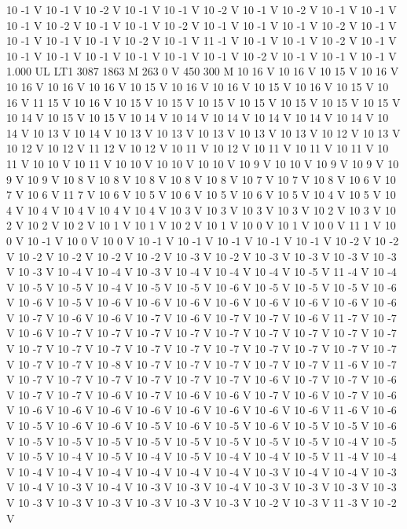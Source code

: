 {{10 -1 V
10 -1 V
10 -2 V
10 -1 V
10 -1 V
10 -2 V
10 -1 V
10 -2 V
10 -1 V
10 -1 V
10 -1 V
10 -2 V
10 -1 V
10 -1 V
10 -2 V
10 -1 V
10 -1 V
10 -1 V
10 -2 V
10 -1 V
10 -1 V
10 -1 V
10 -1 V
10 -2 V
10 -1 V
11 -1 V
10 -1 V
10 -1 V
10 -2 V
10 -1 V
10 -1 V
10 -1 V
10 -1 V
10 -1 V
10 -1 V
10 -1 V
10 -2 V
10 -1 V
10 -1 V
10 -1 V
1.000 UL
LT1
3087 1863 M
263 0 V
450 300 M
10 16 V
10 16 V
10 15 V
10 16 V
10 16 V
10 16 V
10 16 V
10 15 V
10 16 V
10 16 V
10 15 V
10 16 V
10 15 V
10 16 V
11 15 V
10 16 V
10 15 V
10 15 V
10 15 V
10 15 V
10 15 V
10 15 V
10 15 V
10 14 V
10 15 V
10 15 V
10 14 V
10 14 V
10 14 V
10 14 V
10 14 V
10 14 V
10 14 V
10 13 V
10 14 V
10 13 V
10 13 V
10 13 V
10 13 V
10 13 V
10 12 V
10 13 V
10 12 V
10 12 V
11 12 V
10 12 V
10 11 V
10 12 V
10 11 V
10 11 V
10 11 V
10 11 V
10 10 V
10 11 V
10 10 V
10 10 V
10 10 V
10 9 V
10 10 V
10 9 V
10 9 V
10 9 V
10 9 V
10 8 V
10 8 V
10 8 V
10 8 V
10 8 V
10 7 V
10 7 V
10 8 V
10 6 V
10 7 V
10 6 V
11 7 V
10 6 V
10 5 V
10 6 V
10 5 V
10 6 V
10 5 V
10 4 V
10 5 V
10 4 V
10 4 V
10 4 V
10 4 V
10 4 V
10 3 V
10 3 V
10 3 V
10 3 V
10 2 V
10 3 V
10 2 V
10 2 V
10 2 V
10 1 V
10 1 V
10 2 V
10 1 V
10 0 V
10 1 V
10 0 V
11 1 V
10 0 V
10 -1 V
10 0 V
10 0 V
10 -1 V
10 -1 V
10 -1 V
10 -1 V
10 -1 V
10 -2 V
10 -2 V
10 -2 V
10 -2 V
10 -2 V
10 -2 V
10 -3 V
10 -2 V
10 -3 V
10 -3 V
10 -3 V
10 -3 V
10 -3 V
10 -4 V
10 -4 V
10 -3 V
10 -4 V
10 -4 V
10 -4 V
10 -5 V
11 -4 V
10 -4 V
10 -5 V
10 -5 V
10 -4 V
10 -5 V
10 -5 V
10 -6 V
10 -5 V
10 -5 V
10 -5 V
10 -6 V
10 -6 V
10 -5 V
10 -6 V
10 -6 V
10 -6 V
10 -6 V
10 -6 V
10 -6 V
10 -6 V
10 -6 V
10 -7 V
10 -6 V
10 -6 V
10 -7 V
10 -6 V
10 -7 V
10 -7 V
10 -6 V
11 -7 V
10 -7 V
10 -6 V
10 -7 V
10 -7 V
10 -7 V
10 -7 V
10 -7 V
10 -7 V
10 -7 V
10 -7 V
10 -7 V
10 -7 V
10 -7 V
10 -7 V
10 -7 V
10 -7 V
10 -7 V
10 -7 V
10 -7 V
10 -7 V
10 -7 V
10 -7 V
10 -7 V
10 -8 V
10 -7 V
10 -7 V
10 -7 V
10 -7 V
10 -7 V
11 -6 V
10 -7 V
10 -7 V
10 -7 V
10 -7 V
10 -7 V
10 -7 V
10 -7 V
10 -6 V
10 -7 V
10 -7 V
10 -6 V
10 -7 V
10 -7 V
10 -6 V
10 -7 V
10 -6 V
10 -6 V
10 -7 V
10 -6 V
10 -7 V
10 -6 V
10 -6 V
10 -6 V
10 -6 V
10 -6 V
10 -6 V
10 -6 V
10 -6 V
10 -6 V
11 -6 V
10 -6 V
10 -5 V
10 -6 V
10 -6 V
10 -5 V
10 -6 V
10 -5 V
10 -6 V
10 -5 V
10 -5 V
10 -6 V
10 -5 V
10 -5 V
10 -5 V
10 -5 V
10 -5 V
10 -5 V
10 -5 V
10 -5 V
10 -4 V
10 -5 V
10 -5 V
10 -4 V
10 -5 V
10 -4 V
10 -5 V
10 -4 V
10 -4 V
10 -5 V
11 -4 V
10 -4 V
10 -4 V
10 -4 V
10 -4 V
10 -4 V
10 -4 V
10 -4 V
10 -3 V
10 -4 V
10 -4 V
10 -3 V
10 -4 V
10 -3 V
10 -4 V
10 -3 V
10 -3 V
10 -4 V
10 -3 V
10 -3 V
10 -3 V
10 -3 V
10 -3 V
10 -3 V
10 -3 V
10 -3 V
10 -3 V
10 -3 V
10 -2 V
10 -3 V
11 -3 V
10 -2 V
}}
